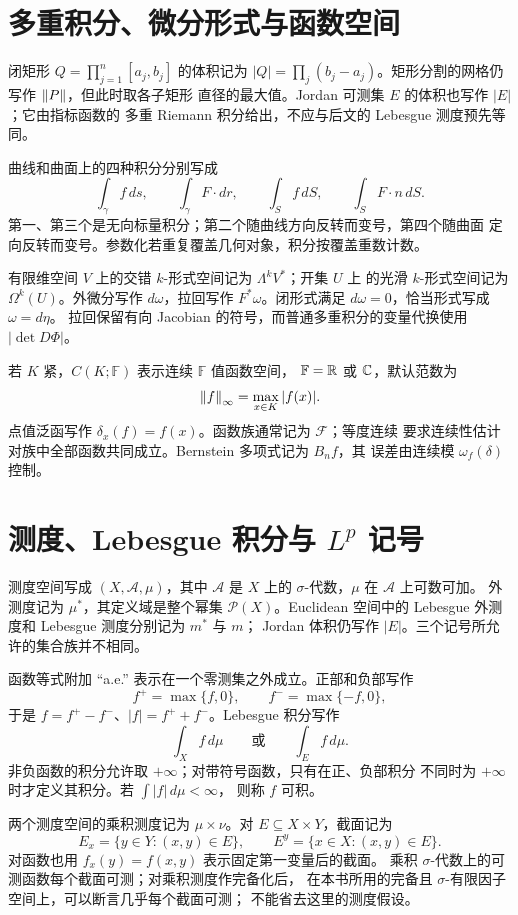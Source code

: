 \section{多重积分、微分形式与函数空间}

闭矩形 $Q=\prod_{j=1}^n[a_j,b_j]$ 的体积记为
$|Q|=\prod_j(b_j-a_j)$。矩形分割的网格仍写作 $\left\lVert P\right\rVert$，但此时取各子矩形
直径的最大值。Jordan 可测集 $E$ 的体积也写作 $|E|$；它由指标函数的
多重 Riemann 积分给出，不应与后文的 Lebesgue 测度预先等同。

曲线和曲面上的四种积分分别写成
\[
 \int_\gamma f\,ds,\qquad \int_\gamma F\cdot dr,
 \qquad \int_S f\,dS,\qquad \int_S F\cdot n\,dS.
\]
第一、第三个是无向标量积分；第二个随曲线方向反转而变号，第四个随曲面
定向反转而变号。参数化若重复覆盖几何对象，积分按覆盖重数计数。

有限维空间 $V$ 上的交错 $k$-形式空间记为 $\Lambda^kV^*$；开集 $U$ 上
的光滑 $k$-形式空间记为 $\Omega^k(U)$。外微分写作 $d\omega$，拉回写作
$F^*\omega$。闭形式满足 $d\omega=0$，恰当形式写成 $\omega=d\eta$。
拉回保留有向 Jacobian 的符号，而普通多重积分的变量代换使用
$|\det D\Phi|$。

若 $K$ 紧，$C(K;\mathbb F)$ 表示连续 $\mathbb F$ 值函数空间，
$\mathbb F=\mathbb{R}$ 或 $\mathbb{C}$，默认范数为
\[
 \left\lVert f\right\rVert_\infty=\max_{x\in K}|f(x)|.
\]
点值泛函写作 $\delta_x(f)=f(x)$。函数族通常记为 $\mathcal F$；等度连续
要求连续性估计对族中全部函数共同成立。Bernstein 多项式记为 $B_nf$，其
误差由连续模 $\omega_f(\delta)$ 控制。

\section{\texorpdfstring{测度、Lebesgue 积分与 \(L^p\) 记号}{测度、Lebesgue 积分与 Lp 记号}}

测度空间写成 \((X,\mathcal A,\mu)\)，其中 \(\mathcal A\) 是
\(X\) 上的 \(\sigma\)-代数，\(\mu\) 在 \(\mathcal A\) 上可数可加。
外测度记为 \(\mu^*\)，其定义域是整个幂集 \(\mathcal P(X)\)。Euclidean
空间中的 Lebesgue 外测度和 Lebesgue 测度分别记为 \(m^*\) 与 \(m\)；
Jordan 体积仍写作 \(|E|\)。三个记号所允许的集合族并不相同。

函数等式附加 ``a.e.'' 表示在一个零测集之外成立。正部和负部写作
\[
 f^+=\max\{f,0\},\qquad f^-=\max\{-f,0\},
\]
于是 \(f=f^+-f^-\)、\(|f|=f^++f^-\)。Lebesgue 积分写作
\[
 \int_X f\,d\mu\qquad\text{或}\qquad \int_E f\,d\mu.
\]
非负函数的积分允许取 \(+\infty\)；对带符号函数，只有在正、负部积分
不同时为 \(+\infty\) 时才定义其积分。若 \(\int|f|\,d\mu<\infty\)，
则称 \(f\) 可积。

两个测度空间的乘积测度记为 \(\mu\times\nu\)。对
\(E\subseteq X\times Y\)，截面记为
\[
 E_x=\{y\in Y:(x,y)\in E\},\qquad
 E^y=\{x\in X:(x,y)\in E\}.
\]
对函数也用 \(f_x(y)=f(x,y)\) 表示固定第一变量后的截面。
乘积 \(\sigma\)-代数上的可测函数每个截面可测；对乘积测度作完备化后，
在本书所用的完备且 $\sigma$-有限因子空间上，可以断言几乎每个截面可测；
不能省去这里的测度假设。

